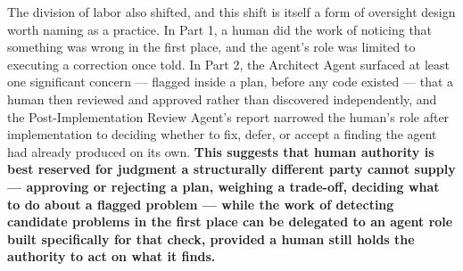 The division of labor also shifted, and this shift is itself a form of oversight design worth naming as a practice. In Part 1, a human did the work of noticing that something was wrong in the first place, and the agent's role was limited to executing a correction once told. In Part 2, the Architect Agent surfaced at least one significant concern --- flagged inside a plan, before any code existed --- that a human then reviewed and approved rather than discovered independently, and the Post-Implementation Review Agent's report narrowed the human's role after implementation to deciding whether to fix, defer, or accept a finding the agent had already produced on its own. \textbf{This suggests that human authority is best reserved for judgment a structurally different party cannot supply --- approving or rejecting a plan, weighing a trade-off, deciding what to do about a flagged problem --- while the work of detecting candidate problems in the first place can be delegated to an agent role built specifically for that check, provided a human still holds the authority to act on what it finds.}


